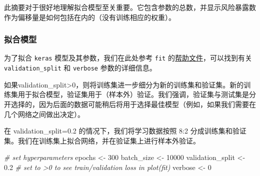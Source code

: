 \documentclass[
]{article}
\newenvironment{Shaded}{\begin{snugshade}}{\end{snugshade}}
\newcommand{\CommentTok}[1]{\textcolor[rgb]{0.56,0.35,0.01}{\textit{#1}}}
\newcommand{\DecValTok}[1]{\textcolor[rgb]{0.00,0.00,0.81}{#1}}
\newcommand{\FloatTok}[1]{\textcolor[rgb]{0.00,0.00,0.81}{#1}}
\newcommand{\NormalTok}[1]{#1}
\newcommand{\OtherTok}[1]{\textcolor[rgb]{0.56,0.35,0.01}{#1}}
\begin{document}
此摘要对于很好地理解拟合模型至关重要。它包含参数的总数，并显示风险暴露数作为偏移量是如何包括在内的（没有训练相应的权重）。

\subsubsection{拟合模型}\label{ux62dfux5408ux6a21ux578b-1}

为了拟合 \texttt{keras} 模型及其参数，我们在此处参考 \texttt{fit}
的\href{https://keras.rstudio.com/reference/fit.html}{帮助文件}，可以找到有关
\texttt{validation\_split} 和 \texttt{verbose} 参数的详细信息。

如果validation\_split\textgreater0，则将训练集进一步细分为新的训练集和验证集。新的训练集用于拟合模型，验证集用于（样本外）验证。我们强调，验证集与测试集是分开选择的，因为后面的数据可能稍后将用于选择最佳模型（例如，如果我们需要在几个网络之间做出决定）。

在 validation\_split=0.2 的情况下，我们将学习数据按照 8:2
分成训练集和验证集。我们在训练集上拟合网络，并在验证集上进行样本外验证。

\begin{Shaded}
\begin{Highlighting}[]
\CommentTok{\# set hyperparameters}
\NormalTok{epochs }\OtherTok{\textless{}{-}} \DecValTok{300}
\NormalTok{batch\_size }\OtherTok{\textless{}{-}} \DecValTok{10000}
\NormalTok{validation\_split }\OtherTok{\textless{}{-}} \FloatTok{0.2}  \CommentTok{\# set to \textgreater{}0 to see train/validation loss in plot(fit)}
\NormalTok{verbose }\OtherTok{\textless{}{-}} \DecValTok{0}
\end{Highlighting}
\end{Shaded}
\end{document}
